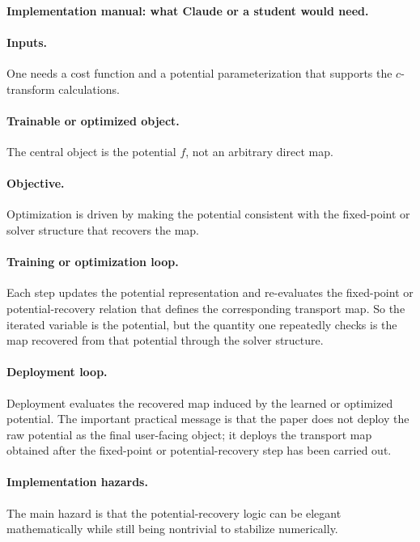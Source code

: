 \documentclass[11pt]{report}
\begin{document}
\paragraph{Implementation manual: what Claude or a student would need.}
\paragraph{Inputs.}
One needs a cost function and a potential parameterization that supports the
$c$-transform calculations.

\paragraph{Trainable or optimized object.}
The central object is the potential $f$, not an arbitrary direct map.

\paragraph{Objective.}
Optimization is driven by making the potential consistent with the fixed-point or
solver structure that recovers the map.

\paragraph{Training or optimization loop.}
Each step updates the potential representation and re-evaluates the fixed-point or
potential-recovery relation that defines the corresponding transport map.  So the
iterated variable is the potential, but the quantity one repeatedly checks is the map
recovered from that potential through the solver structure.

\paragraph{Deployment loop.}
Deployment evaluates the recovered map induced by the learned or optimized
potential.  The important practical message is that the paper does not deploy the raw
potential as the final user-facing object; it deploys the transport map obtained after
the fixed-point or potential-recovery step has been carried out.

\paragraph{Implementation hazards.}
The main hazard is that the potential-recovery logic can be elegant mathematically
while still being nontrivial to stabilize numerically.
\end{document}
